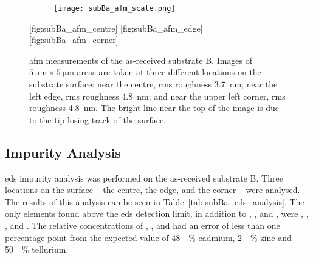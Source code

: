 \begin{figure}[htbp]
    \centering
    \begin{subfigure}[b]{0.032\linewidth}
        \label{fig:subBa_afm_scale}\captionsetup{list=no}
        \texttt{[image: subBa\_afm\_scale.png]}
    \end{subfigure}
    \hfill
    [fig:subBa_afm_centre]
    \hfill
    [fig:subBa_afm_edge]
    \hfill
    [fig:subBa_afm_corner]
    \caption[\Ac{afm} of as-received substrate B.]{\Ac{afm} measurements of the as-received substrate B. Images of $\SI{5}{\micro\metre}\times\SI{5}{\micro\metre}$ areas are taken at three different locations on the substrate surface:  near the centre, \ac{rms} roughness \SI{3,7}{\nano\metre};  near the left edge, \ac{rms} roughness \SI{4,8}{\nano\metre}; and  near the upper left corner, \ac{rms} roughness \SI{4,8}{\nano\metre}. The bright line near the top of the image is due to the tip losing track of the surface.}\label{fig:subBa_afm}
\end{figure} %


\subsection{Impurity Analysis}

\Ac{eds} impurity analysis was performed on the as-received substrate B. Three locations on the surface -- the centre, the edge, and the corner -- were analysed. The results of this analysis can be seen in Table~\ref{tab:subBa_eds_analysis}. The only elements found above the \ac{eds} detection limit, in addition to , , and , were , , , and . The relative concentrations of , , and  had an error of less than one percentage point from the expected value of \SI{48}{\atomic\percent} cadmium, \SI{2}{\atomic\percent} zinc and \SI{50}{\atomic\percent} tellurium.

